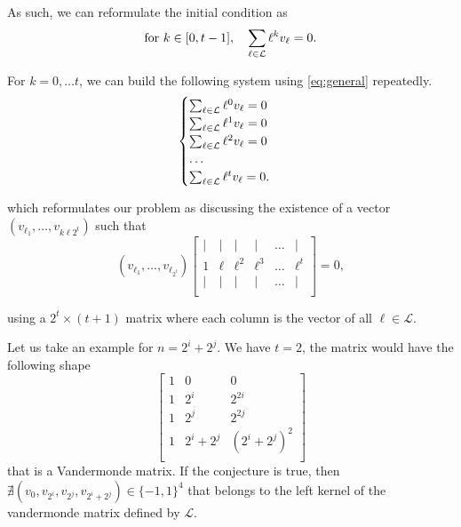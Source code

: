 As such, we can reformulate the initial condition as
\begin{equation}\label{eq:general}
    \text{for } k \in [0, t-1], \quad \sum_{\ell \in \mathcal{L}} \ell^kv_\ell = 0.
\end{equation}

For $k = 0, \ldots t$, we can build the following system using \cref{eq:general} repeatedly.
\begin{equation}
    \begin{cases}
        \sum_{\ell \in \mathcal{L}} \ell^0v_\ell = 0\\
        \sum_{\ell \in \mathcal{L}} \ell^1v_\ell = 0\\
        \sum_{\ell \in \mathcal{L}} \ell^2v_\ell = 0\\
        \ldots\\
        \sum_{\ell \in \mathcal{L}} \ell^tv_\ell = 0.\\
    \end{cases}
\end{equation}

which reformulates our problem as discussing the existence of a vector $(v_{\ell_1}, \ldots, v_{k\ell{2^t}})$ such that
$$
(v_{\ell_1}, \ldots, v_{\ell_{2^t}})
\begin{bmatrix}
    | & | & | & | & \ldots & |\\
    1 & \ell & \ell^2 & \ell^3 & \ldots & \ell^t\\
    | & | & | & | & \ldots & |\\
\end{bmatrix} = 0,
$$

using a  $2^t \times (t + 1)$ matrix where each column is the vector of all $\ell \in \mathcal{L}$.

Let us take an example for $n = 2^i + 2^j$. We have $t = 2$, the matrix would have the following shape
$$
\begin{bmatrix}
    1 & 0 & 0\\
    1 & 2^i & 2^{2i}\\
    1 & 2^j & 2^{2j}\\
    1 & 2^i + 2^j & (2^i + 2^j)^2\\
\end{bmatrix}
$$
that is a Vandermonde matrix. If the conjecture is true, then $\nexists (v_0, v_{2^i}, v_{2^j}, v_{2^i + 2^j}) \in \{-1, 1\}^4$ that belongs to the left kernel of the vandermonde matrix defined by $\mathcal{L}$.
